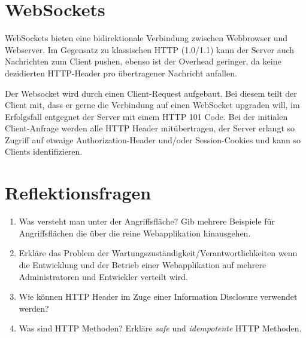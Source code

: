 \section{WebSockets} 

WebSockets bieten eine bidirektionale Verbindung zwischen Webbrowser und Webserver. Im Gegensatz zu klassischen HTTP (1.0/1.1) kann der Server auch Nachrichten zum Client pushen, ebenso ist der Overhead geringer, da keine dezidierten HTTP-Header pro übertragener Nachricht anfallen.

Der Websocket wird durch einen Client-Request aufgebaut. Bei diesem teilt der Client mit, dass er gerne die Verbindung auf einen WebSocket upgraden will, im Erfolgsfall entgegnet der Server mit einem HTTP 101 Code. Bei der initialen Client-Anfrage werden alle HTTP Header mitübertragen, der Server erlangt so Zugriff auf etwaige Authorization-Header und/oder Session-Cookies und kann so Clients identifizieren.

\section{Reflektionsfragen}

\begin{enumerate}
	\item Was versteht man unter der Angriffsfläche? Gib mehrere Beispiele für Angriffsflächen die über die reine Webapplikation hinausgehen.
	\item Erkläre das Problem der Wartungszuständigkeit/Verantwortlichkeiten wenn die Entwicklung und der Betrieb einer Webapplikation auf mehrere Administratoren und Entwickler verteilt wird.
	\item Wie können HTTP Header im Zuge einer Information Disclosure verwendet werden?
	\item Was sind HTTP Methoden? Erkläre \textit{safe} und \textit{idempotente} HTTP Methoden.
\end{enumerate}

